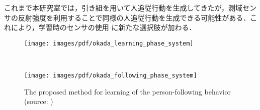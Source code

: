   これまで本研究室では，引き紐を用いて人追従行動を生成してきたが，測域センサの反射強度を利用することで同様の人追従行動を生成できる可能性がある．これにより，学習時のセンサの使用
  に新たな選択肢が加わる．

\newpage

\vspace{2cm}

  \begin{figure}[h]
    \centering
    \begin{minipage}[c]{120mm} 
        \centering
        \texttt{[image: images/pdf/okada\_learning\_phase\_system]}
    \end{minipage} \\
    \vspace{1em} %
    \begin{minipage}[c]{120mm} 
        \centering
        \texttt{[image: images/pdf/okada\_following\_phase\_system]}
    \end{minipage}
    \caption[The proposed method for learning of the person-following behavior]{The proposed method for learning of the person-following behavior (source: \cite{okada})}
    \label{Fig:okada_system}
  \end{figure}

\newpage

